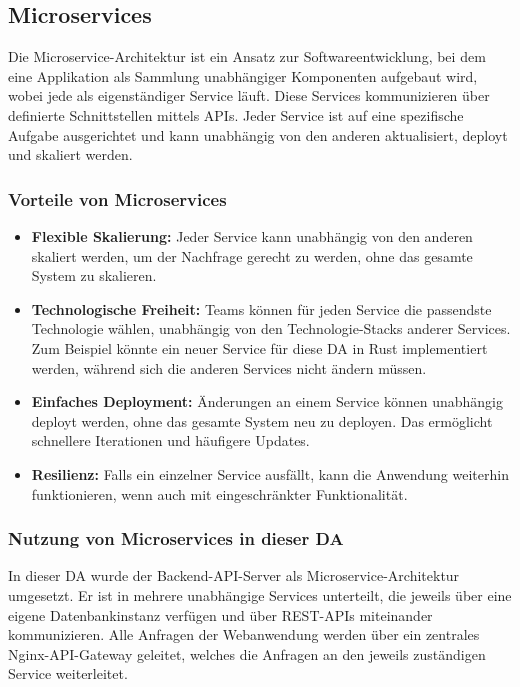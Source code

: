 \newpage

\subsection{Microservices}
Die Microservice-Architektur ist ein Ansatz zur Softwareentwicklung, bei dem eine Applikation als Sammlung unabhängiger Komponenten
aufgebaut wird, wobei jede als eigenständiger Service läuft. Diese Services kommunizieren über definierte Schnittstellen mittels \gls{API}s.
Jeder Service ist auf eine spezifische Aufgabe ausgerichtet und kann unabhängig von den anderen aktualisiert, deployt und skaliert werden.\cite{aws_microservices}

\subsubsection{Vorteile von Microservices}
\begin{itemize}
    \item \textbf{Flexible Skalierung:} Jeder Service kann unabhängig von den anderen skaliert werden, um der Nachfrage gerecht zu werden, ohne das gesamte System zu skalieren.
    \item \textbf{Technologische Freiheit:} Teams können für jeden Service die passendste Technologie wählen, unabhängig von den Technologie-Stacks anderer Services.
    Zum Beispiel könnte ein neuer Service für diese \gls{DA} in Rust implementiert werden, während sich die anderen Services nicht ändern müssen.
    \item \textbf{Einfaches Deployment:} Änderungen an einem Service können unabhängig deployt werden, ohne das gesamte System neu zu deployen. Das ermöglicht schnellere Iterationen und häufigere Updates.
    \item \textbf{Resilienz:} Falls ein einzelner Service ausfällt, kann die Anwendung weiterhin funktionieren, wenn auch mit eingeschränkter Funktionalität.\cite{aws_microservices}
\end{itemize}

\subsubsection{Nutzung von Microservices in dieser \gls{DA}}
In dieser \gls{DA} wurde der Backend-\gls{API}-Server als Microservice-Architektur umgesetzt. 
Er ist in mehrere unabhängige Services unterteilt, die jeweils über eine eigene Datenbankinstanz verfügen und über REST-\gls{API}s miteinander kommunizieren.
Alle Anfragen der Webanwendung werden über ein zentrales Nginx-\gls{API}-Gateway geleitet, welches die Anfragen an den jeweils zuständigen Service weiterleitet.

\newpage
